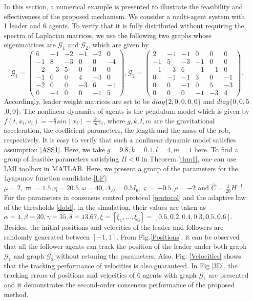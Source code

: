 \documentclass[review]{elsarticle}
\begin{document}
In this section, a numerical example is presented to illustrate the feasibility and effectiveness of the proposed mechanism. 
We consider a multi-agent system with 1 leader and 6 agents. To verify that it is fully distributed without requiring the spectra of Laplacian matrices, we use the following two graphs whose eigenmatrices are $\mathcal{G}_1 $  and $\mathcal{G}_2 $, which are given by
$$\mathcal{G}_1  = \begin{pmatrix}6&-1&-2&-1&-2&0\\-1&8&-3&0&0&-4\\-2&-3&5&0&0&0\\-1&0&0&4&-3&0\\-2&0&0&-3&6&-1\\0&-4&0&0&-1&5 \end{pmatrix},
\mathcal{G}_2 =  \begin{pmatrix}2&-1&-1&0 &0&0\\-1&5&-3&-1&0&0\\-1&-3&6&-1&-1&0\\0&-1&-1&3&0&-1\\0&0&-1&0&5&-3\\0&0&0&-1&-3&4\end{pmatrix}.$$
Accordingly, leader weight matrices are set to be $diag\{2,0,0,0,0\}$ and $diag\{0,0,5$ ,$0,0\}$.
The nonlinear dynamics of agents is the pendulum model which is given by $f(t,x_i,v_i) = -\frac{g}{l}sin(x_i) - \frac{k}{m} v_i $, where $g,k,l,m$ are the gravitational acceleration, the coefficient parameters, the length and the mass of the rob, respectively. It is easy to verify that such a nonlinear dynamic model satisfies assumption \ref{ASS1}. Here, we take $g=9.8, k=0.1, l= 4, m=1$ here. To find a group of feasible parameters satisfying $\Pi<0$ in Theorem.\ref{thm1}, one can use LMI toolbox in MATLAB. Here, we present a group of the parameters for the Lyapunov function candidate \eqref{LF}: $\mu = 2, \varpi = 1.5, \eta  = 20.5, \omega = 40, \Delta_D = 0.5I_6,\varsigma = -0.5, \rho = -2$ and $\hat C = \frac{1}{20} H^{-1}$. For the parameters in consensus control protocol \eqref{protocol} and the adaptive law of the thresholds \eqref{dotd}, in the simulation, their values are taken as $\alpha = 1, \beta = 30, \gamma = 35, \delta = 13.67, \xi = \left[\xi_1,\ldots,\xi_6 \right]  = \left[ 0.5,0.2,0.4,0.3,0.5,0.6\right] $. Besides, the initial positions and velocities of the leader and followers are randomly generated between $\left[ -1,1 \right]$. 
From Fig.\ref{Positions}, it can be observed that all the follower agents can track the position of the leader under both graph $\mathcal{G}_1$ and graph $\mathcal{G}_2$ without retuning the parameters. Also, Fig. \ref{Velocities} shows that the tracking performance of velocities is also guaranteed. 
In Fig.\ref{3D}, the tracking errors of positions and velocities of 6 agents with graph $\mathcal{G}_1$ are presented and it demonstrates the second-order consensus performance of the proposed method. 
\end{document}
